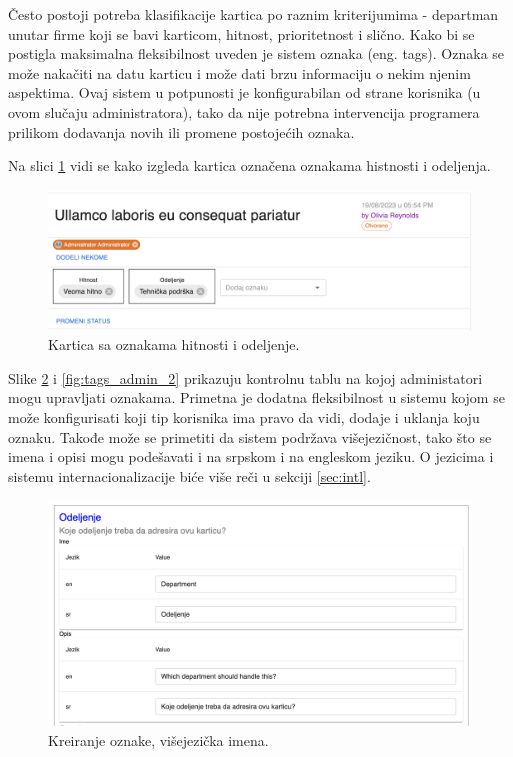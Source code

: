 \documentclass[12pt,oneside]{memoir}
\begin{document}
Često postoji potreba klasifikacije kartica po raznim kriterijumima - departman unutar firme koji se bavi karticom, hitnost, prioritetnost i slično. Kako bi se postigla maksimalna fleksibilnost uveden je sistem oznaka (eng. tags). Oznaka se može nakačiti na datu karticu i može dati brzu informaciju o nekim njenim aspektima. Ovaj sistem u potpunosti je konfigurabilan od strane korisnika (u ovom slučaju administratora), tako da nije potrebna intervencija programera prilikom dodavanja novih ili promene postojećih oznaka.

Na slici \ref{fig:tagged_ticket} vidi se kako izgleda kartica označena oznakama histnosti i odeljenja.

\begin{figure}[h]
  \centering
  \includegraphics[width=1\textwidth]{docs/images/ch_1/tagged-ticket.png} 
  \caption{Kartica sa oznakama hitnosti i odeljenje.}
  \label{fig:tagged_ticket}
\end{figure}

Slike \ref{fig:tags_admin_1} i \ref{fig:tags_admin_2} prikazuju kontrolnu tablu na kojoj administatori mogu upravljati oznakama. Primetna je dodatna fleksibilnost u sistemu kojom se može konfigurisati koji tip korisnika ima pravo da vidi, dodaje i uklanja koju oznaku. Takođe može se primetiti da sistem podržava višejezičnost, tako što se imena i opisi mogu podešavati i na srpskom i na engleskom jeziku. O jezicima i sistemu internacionalizacije biće više reči u sekciji \ref{sec:intl}.


\begin{figure}[h]
  \centering
  \includegraphics[width=1\textwidth]{docs/images/ch_1/tag-mgmt-head.png} 
  \caption{Kreiranje oznake, višejezička imena.}
  \label{fig:tags_admin_1}
\end{figure}
\end{document}
